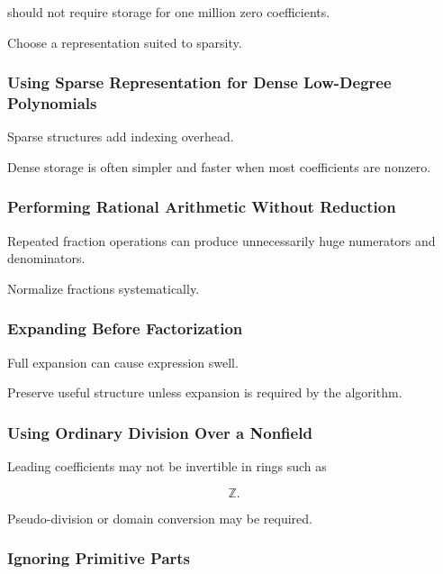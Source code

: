 should not require storage for one million zero coefficients.

Choose a representation suited to sparsity.

\subsubsection{Using Sparse Representation for Dense Low-Degree Polynomials}

Sparse structures add indexing overhead.

Dense storage is often simpler and faster when most coefficients are
nonzero.

\subsubsection{Performing Rational Arithmetic Without Reduction}

Repeated fraction operations can produce unnecessarily huge numerators and
denominators.

Normalize fractions systematically.

\subsubsection{Expanding Before Factorization}

Full expansion can cause expression swell.

Preserve useful structure unless expansion is required by the algorithm.

\subsubsection{Using Ordinary Division Over a Nonfield}

Leading coefficients may not be invertible in rings such as

\[
\mathbb{Z}.
\]

Pseudo-division or domain conversion may be required.

\subsubsection{Ignoring Primitive Parts}

